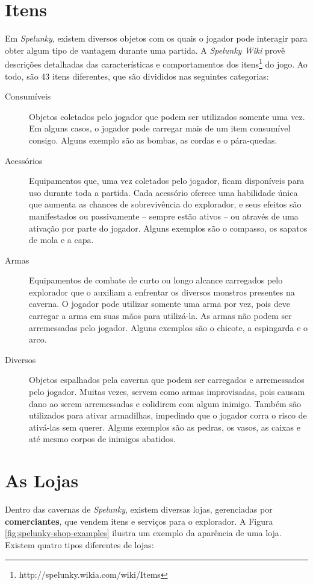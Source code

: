\section{\label{section:spelunky-items}Itens}
Em \textit{Spelunky}, existem diversos objetos com os quais o jogador pode
interagir para obter algum tipo de vantagem durante uma partida. A
\textit{Spelunky Wiki} provê descrições detalhadas das características e
comportamentos dos itens\footnote{http://spelunky.wikia.com/wiki/Items} do jogo.
Ao todo, são 43 itens diferentes, que são divididos nas seguintes categorias:

\begin{description}
	\item[Consumíveis]
	Objetos coletados pelo jogador que podem ser utilizados somente uma vez. Em
	alguns casos, o jogador pode carregar mais de um item consumível consigo.
	Alguns exemplo são as bombas, as cordas e o pára-quedas.

	\item[Acessórios]
	Equipamentos que, uma vez coletados pelo jogador, ficam disponíveis para uso
	durante toda a partida. Cada acessório oferece uma habilidade única que
	aumenta as chances de sobrevivência do explorador, e seus efeitos são
	manifestados ou passivamente -- sempre estão ativos -- ou através de uma
	ativação por parte do jogador. Alguns exemplos são o compasso, os sapatos de
	mola e a capa.

	\item[Armas]
	Equipamentos de combate de curto ou longo alcance carregados pelo explorador
	que o auxiliam a enfrentar os diversos monstros presentes na caverna. O
	jogador pode utilizar somente uma arma por vez, pois deve carregar a arma em
	suas mãos para utilizá-la. As armas não podem ser arremessadas pelo jogador.
	Alguns exemplos são o chicote, a espingarda e o arco.

	\item[Diversos]
	Objetos espalhados pela caverna que podem ser carregados e arremessados pelo
	jogador. Muitas vezes, servem como armas improvisadas, pois causam dano ao
	serem arremessadas e colidirem com algum inimigo. Também são utilizados para
	ativar armadilhas, impedindo que o jogador corra o risco de ativá-las sem
	querer. Alguns exemplos são as pedras, os vasos, as caixas e até mesmo
	corpos de inimigos abatidos. 
\end{description}


\section{\label{section:spelunky-shops}As Lojas}
Dentro das cavernas de \textit{Spelunky}, existem diversas lojas, gerenciadas
por \textbf{comerciantes}, que vendem itens e serviços para o explorador. A
Figura \ref{fig:spelunky-shop-examples} ilustra um exemplo da aparência de uma
loja. Existem quatro tipos diferentes de lojas:

